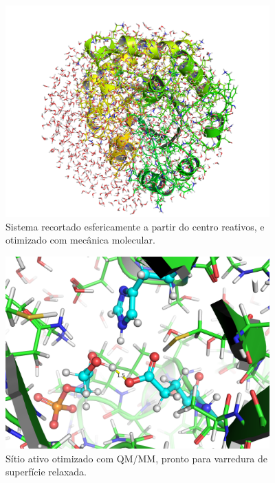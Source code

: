 \documentclass[a4paper,11pt]{refart}
\begin{document}
	\hspace*{-\leftmarginwidth}
	\begin{minipage}{\fullwidth}
		\begin{figure}[H]
			\begin{center}
				\includegraphics[width=4in]{system_prune}
				\caption{Sistema recortado esfericamente a partir do centro reativos, e otimizado com mecânica molecular.}
				\label{system_prune}
			\end{center}
		\end{figure}
	\end{minipage}
	
	\hspace*{-\leftmarginwidth}
	\begin{minipage}{\fullwidth}
		\begin{figure}[H]
			\begin{center}
				\includegraphics[width=4in]{qcmm_opt}
				\caption{Sítio ativo otimizado com QM/MM, pronto para varredura de superfície relaxada.}
				\label{qcmm_opt}
			\end{center}
		\end{figure}
	\end{minipage}
	
\end{document}
